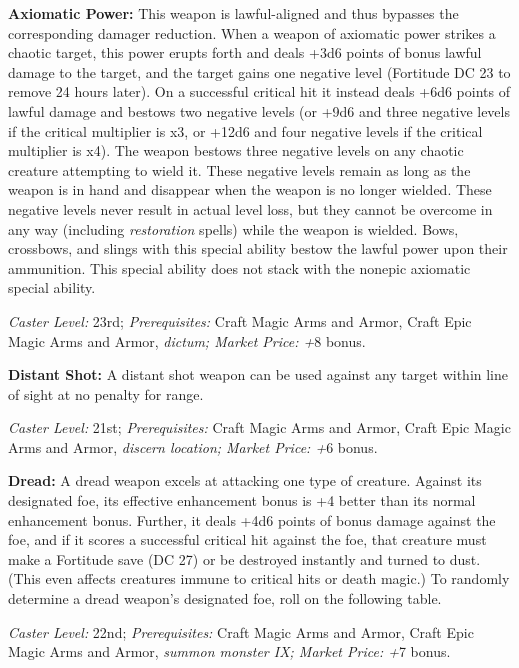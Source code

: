 \documentclass{article}
\begin{document}
\textbf{Axiomatic Power: }This weapon is lawful-aligned and thus bypasses the corresponding 
damager reduction. When a weapon of axiomatic power strikes a chaotic target, this 
power erupts forth and deals +3d6 points of bonus lawful damage to the target, 
and the target gains one negative level (Fortitude DC 23 to remove 24 hours later). 
On a successful critical hit it instead deals +6d6 points of lawful damage and 
bestows two negative levels (or +9d6 and three negative levels if the critical 
multiplier is x3, or +12d6 and four negative levels if the critical multiplier 
is x4). The weapon bestows three negative levels on any chaotic creature attempting 
to wield it. These negative levels remain as long as the weapon is in hand and 
disappear when the weapon is no longer wielded. These negative levels never result 
in actual level loss, but they cannot be overcome in any way (including \textit{restoration 
}spells) while the weapon is wielded. Bows, crossbows, and slings with this special 
ability bestow the lawful power upon their ammunition. This special ability does 
not stack with the nonepic axiomatic special ability.\textit{ }

\textit{Caster Level: }23rd; \textit{Prerequisites: }Craft Magic Arms and Armor, 
Craft Epic Magic Arms and Armor, \textit{dictum; Market Price: +}8 bonus. 

\textbf{Distant Shot: }A distant shot weapon can be used against any target within 
line of sight at no penalty for range. 

\textit{Caster Level: }21st; \textit{Prerequisites: }Craft Magic Arms and Armor, 
Craft Epic Magic Arms and Armor, \textit{discern location; Market Price: +}6 bonus. 

\textbf{Dread: }A dread weapon excels at attacking one type of creature. Against 
its designated foe, its effective enhancement bonus is +4 better than its normal 
enhancement bonus. Further, it deals +4d6 points of bonus damage against the foe, 
and if it scores a successful critical hit against the foe, that creature must 
make a Fortitude save (DC 27) or be destroyed instantly and turned to dust. (This 
even affects creatures immune to critical hits or death magic.) To randomly determine 
a dread weapon's designated foe, roll on the following table. 

\textit{Caster Level: }22nd; \textit{Prerequisites: }Craft Magic Arms and Armor, 
Craft Epic Magic Arms and Armor, \textit{summon monster IX; Market Price: +}7 bonus. 
\end{document}
